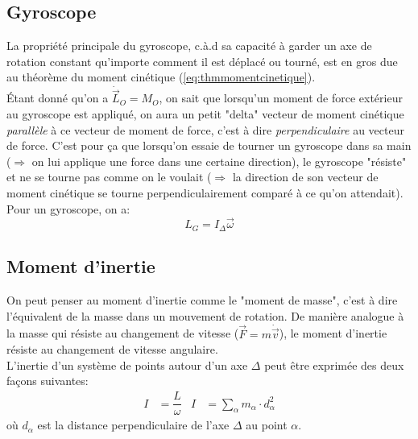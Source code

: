 \documentclass{article}
\numberwithin{equation}{section}
\begin{document}
\subsection{Gyroscope}
La propriété principale du gyroscope, c.à.d sa capacité à garder un axe de rotation constant qu'importe comment il est déplacé ou tourné, est en gros due au théorème du moment cinétique (\ref{eq:thmmomentcinetique}). \\

Étant donné qu'on a \( \dot{\vec L}_O = M_O\), on sait que lorsqu'un moment de force extérieur au gyroscope est appliqué, on aura un petit "delta" vecteur de moment cinétique \emph{parallèle} à ce vecteur de moment de force, c'est à dire \emph{perpendiculaire} au vecteur de force. C'est pour ça que lorsqu'on essaie de tourner un gyroscope dans sa main (\(\Rightarrow\) on lui applique une force dans une certaine direction), le gyroscope "résiste" et ne se tourne pas comme on le voulait (\(\Rightarrow\) la direction de son vecteur de moment cinétique se tourne perpendiculairement comparé à ce qu'on attendait). \\

Pour un gyroscope, on a:
\begin{equation}
	L_G = I_\Delta \vec \omega
\end{equation}

\subsection{Moment d'inertie}
On peut penser au moment d'inertie comme le "moment de masse", c'est à dire l'équivalent de la masse dans un mouvement de rotation. De manière analogue à la masse qui résiste au changement de vitesse (\(\vec F = m \dot{\vec v}\)), le moment d'inertie résiste au changement de vitesse angulaire. \\

L'inertie d'un système de points autour d'un axe \(\Delta\) peut être exprimée des deux façons suivantes:
\begin{align*}
	I &= \dfrac{L}{\omega} & I &= \sum_\alpha m_\alpha \cdot d_\alpha^2
\end{align*}
où \(d_\alpha\) est la distance perpendiculaire de l'axe \(\Delta\) au point \(\alpha\).
\end{document}
